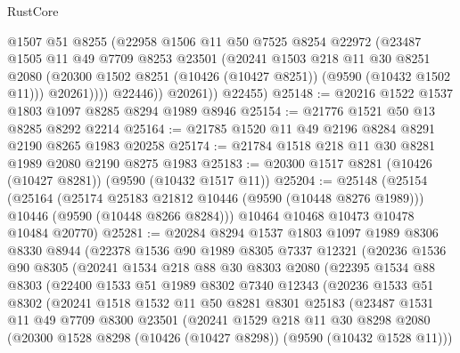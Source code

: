 \begin{lexlean}{RustCore}
\begin{coremodule}
                @1507
                @51
                @8255
                (@22958
                  @1506
                  @11
                  @50
                  @7525
                  @8254
                  @22972
                  (@23487
                    @1505
                    @11
                    @49
                    @7709
                    @8253
                    @23501
                    (@20241
                      @1503
                      @218
                      @11
                      @30
                      @8251
                      @2080
                      (@20300 @1502 @8251 (@10426 (@10427 @8251)) (@9590 (@10432 @1502 @11)))
                      @20261))))
              @22446))
          @20261))
      @22455)
@25148 := @20216 @1522 @1537 @1803 @1097 @8285 @8294 @1989 @8946
@25154 := @21776 @1521 @50 @13 @8285 @8292 @2214
@25164 := @21785 @1520 @11 @49 @2196 @8284 @8291 @2190 @8265 @1983 @20258
@25174 := @21784 @1518 @218 @11 @30 @8281 @1989 @2080 @2190 @8275 @1983
@25183 := @20300 @1517 @8281 (@10426 (@10427 @8281)) (@9590 (@10432 @1517 @11))
@25204 := @25148
    (@25154
      (@25164
        (@25174 @25183 @21812 @10446 (@9590 (@10448 @8276 @1989)))
        @10446
        (@9590 (@10448 @8266 @8284)))
      @10464
      @10468
      @10473
      @10478
      @10484
      @20770)
@25281 := @20284
    @8294
    @1537
    @1803
    @1097
    @1989
    @8306
    @8330
    @8944
    (@22378
      @1536
      @90
      @1989
      @8305
      @7337
      @12321
      (@20236
        @1536
        @90
        @8305
        (@20241
          @1534
          @218
          @88
          @30
          @8303
          @2080
          (@22395
            @1534
            @88
            @8303
            (@22400
              @1533
              @51
              @1989
              @8302
              @7340
              @12343
              (@20236
                @1533
                @51
                @8302
                (@20241
                  @1518
                  @1532
                  @11
                  @50
                  @8281
                  @8301
                  @25183
                  (@23487
                    @1531
                    @11
                    @49
                    @7709
                    @8300
                    @23501
                    (@20241
                      @1529
                      @218
                      @11
                      @30
                      @8298
                      @2080
                      (@20300 @1528 @8298 (@10426 (@10427 @8298)) (@9590 (@10432 @1528 @11)))

\end{coremodule}
\end{lexlean}
